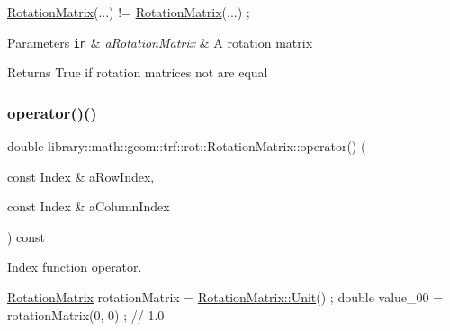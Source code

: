 \begin{DoxyCode}
\hyperlink{classlibrary_1_1math_1_1geom_1_1trf_1_1rot_1_1_rotation_matrix_a667d2c05aa5b0cc88775938d11164cdc}{RotationMatrix}(...) != \hyperlink{classlibrary_1_1math_1_1geom_1_1trf_1_1rot_1_1_rotation_matrix_a667d2c05aa5b0cc88775938d11164cdc}{RotationMatrix}(...) ;
\end{DoxyCode}



\begin{DoxyParams}[1]{Parameters}
\mbox{\tt in}  & {\em a\+Rotation\+Matrix} & A rotation matrix \\
\hline
\end{DoxyParams}
\begin{DoxyReturn}{Returns}
True if rotation matrices not are equal 
\end{DoxyReturn}
\mbox{\label{classlibrary_1_1math_1_1geom_1_1trf_1_1rot_1_1_rotation_matrix_a55edc4e5e8514623bd60f2473ec6e93d}} 
\subsubsection{\texorpdfstring{operator()()}{operator()()}\hspace{0.1cm}{\footnotesize\ttfamily [1/2]}}
{\footnotesize\ttfamily double library\+::math\+::geom\+::trf\+::rot\+::\+Rotation\+Matrix\+::operator() (\begin{DoxyParamCaption}\item[{const Index \&}]{a\+Row\+Index,  }\item[{const Index \&}]{a\+Column\+Index }\end{DoxyParamCaption}) const}



Index function operator. 


\begin{DoxyCode}
\hyperlink{classlibrary_1_1math_1_1geom_1_1trf_1_1rot_1_1_rotation_matrix_a667d2c05aa5b0cc88775938d11164cdc}{RotationMatrix} rotationMatrix = \hyperlink{classlibrary_1_1math_1_1geom_1_1trf_1_1rot_1_1_rotation_matrix_aac59b7dafc34767d24d0934f4b86bef0}{RotationMatrix::Unit}() ;
\textcolor{keywordtype}{double} value\_00 = rotationMatrix(0, 0) ; \textcolor{comment}{// 1.0}
\end{DoxyCode}



